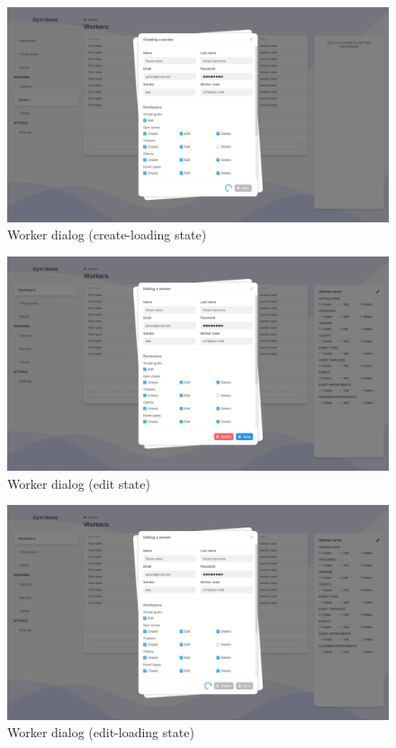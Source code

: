 \documentclass[a4paper, 12pt, oneside]{book}
\begin{document}
\begin{figure}[H]
	\centering
	\includegraphics[width=\textwidth]{assets/ui/WorkersCreateLoading.png}
	\caption{Worker dialog (create-loading state)}
\end{figure}
\begin{figure}[H]
	\centering
	\includegraphics[width=\textwidth]{assets/ui/WorkersEdit.png}
	\caption{Worker dialog (edit state)}
\end{figure}
\begin{figure}[H]
	\centering
	\includegraphics[width=\textwidth]{assets/ui/WorkersEditLoading.png}
	\caption{Worker dialog (edit-loading state)}
\end{figure}
\end{document}
